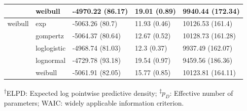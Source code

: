 \documentclass[AMA,STIX1COL]{WileyNJD-v2}
\begin{document}
\begin{table}[!ht]
\begin{tabular}{l|l|l|l|l}
\hline
 & weibull & -4970.22 (86.17) & 19.01 (0.89) & 9940.44 (172.34)\\
\hline
weibull & exp & -5063.26 (80.7) & 11.93 (0.46) & 10126.53 (161.4)\\
\hline
 & gompertz & -5064.37 (80.64) & 12.67 (0.52) & 10128.73 (161.28)\\
\hline
 & loglogistic & -4968.74 (81.03) & 12.3 (0.37) & 9937.49 (162.07)\\
\hline
 & lognormal & -4729.78 (93.18) & 19.54 (0.97) & 9459.56 (186.36)\\
\hline
 & weibull & -5061.91 (82.05) & 15.77 (0.85) & 10123.81 (164.11)\\
\hline
\end{tabular}
\begin{tablenotes}%
\textsuperscript{$\dagger$}ELPD: Expected log pointwise predictive density;
\textsuperscript{$\ddagger$}$p_D$: Effective number of parameters;
WAIC: widely applicable information criterion.
\end{tablenotes}
\end{table}
\end{document}
